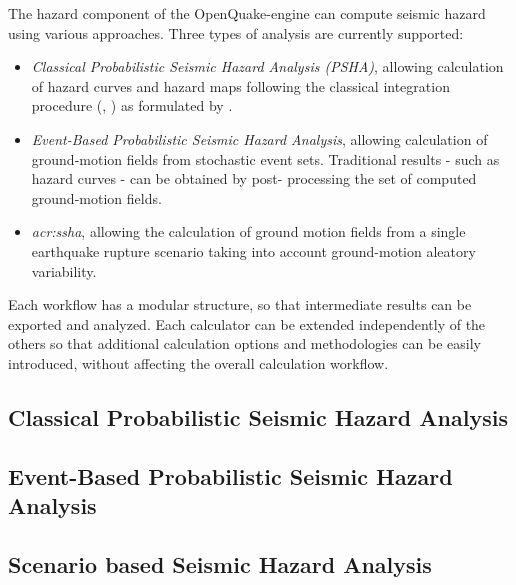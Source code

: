 The hazard component of the OpenQuake-engine can compute seismic hazard using
various approaches. Three types of analysis are currently supported:

\begin{itemize}

	\item \textit{Classical Probabilistic Seismic Hazard Analysis (PSHA)},
	allowing calculation of hazard curves and hazard maps following the
	classical integration procedure (\cite{cornell1968}, \citet{mcguire1976})
	as formulated by \cite{field2003}.

	\item \textit{Event-Based Probabilistic Seismic Hazard Analysis},
	allowing calculation of ground-motion fields from stochastic event sets.
	Traditional results - such as hazard curves - can be obtained by post-
	processing the set of computed ground-motion fields.

	\item \textit{\gls{acr:ssha}}, allowing the calculation of ground
	motion fields from a single earthquake rupture scenario taking into
	account ground-motion aleatory variability.

\end{itemize}

Each workflow has a modular structure, so that intermediate results can be
exported and analyzed. Each calculator can be extended independently of the
others so that additional calculation options and methodologies can be easily
introduced, without affecting the overall calculation workflow.



\subsection{Classical Probabilistic Seismic Hazard Analysis}
\label{subsec:classical_psha}


\subsection{Event-Based Probabilistic Seismic Hazard Analysis}
\label{subsec:event_based_psha}


\subsection{Scenario based Seismic Hazard Analysis}
\label{subsec:scenario_hazard}


\cleardoublepage